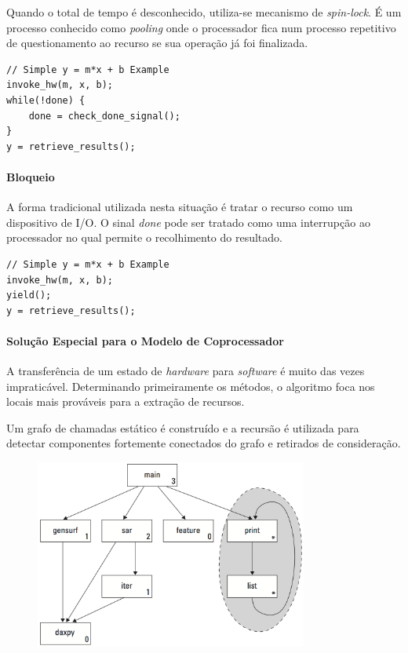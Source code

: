 Quando o total de tempo é desconhecido, utiliza-se mecanismo de \textit{spin-lock}. É um processo conhecido como \textit{pooling} onde o processador fica num processo repetitivo de questionamento ao recurso se sua operação já foi finalizada.



\begin{verbatim}
// Simple y = m*x + b Example 
invoke_hw(m, x, b); 
while(!done) {
    done = check_done_signal(); 
}
y = retrieve_results();
\end{verbatim}



\paragraph{Bloqueio}

A forma tradicional utilizada nesta situação é tratar o recurso como um dispositivo de I/O. O sinal \textit{done} pode ser tratado como uma interrupção ao processador no qual permite o recolhimento do resultado.

\begin{verbatim}
// Simple y = m*x + b Example 
invoke_hw(m, x, b);
yield();
y = retrieve_results();
\end{verbatim}



\paragraph{Solução Especial para o Modelo de Coprocessador}

A transferência de um estado de \textit{hardware} para \textit{software} é muito das vezes impraticável. Determinando primeiramente os métodos, o algoritmo foca nos locais mais prováveis para a extração de recursos. 

Um grafo de chamadas estático é construído e a recursão é utilizada para detectar componentes fortemente conectados do grafo e retirados de consideração.


\begin{figure}[h] \centering
	\includegraphics[width=0.8\textwidth]{img/f4-4.png}
	\caption{}
	\label{fig:f4-4}
\end{figure}

